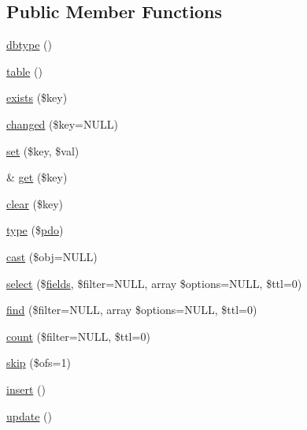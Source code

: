\subsection*{Public Member Functions}
\begin{DoxyCompactItemize}
\item 
\hyperlink{class_d_b_1_1_s_q_l_1_1_mapper_a38948c2fb1711f49b72f123cbd91e611}{dbtype} ()
\item 
\hyperlink{class_d_b_1_1_s_q_l_1_1_mapper_a5aa7b43c8ec77df216a71a27da0a321c}{table} ()
\item 
\hyperlink{class_d_b_1_1_s_q_l_1_1_mapper_ace1ae5be37bf26c172cc7ea4e1a65e26}{exists} (\$key)
\item 
\hyperlink{class_d_b_1_1_s_q_l_1_1_mapper_a20f740dfb4d3aa525f4109bdcf41dab7}{changed} (\$key=N\+U\+LL)
\item 
\hyperlink{class_d_b_1_1_s_q_l_1_1_mapper_ac8d8012023e560c81f55a629022cb65a}{set} (\$key, \$val)
\item 
\& \hyperlink{class_d_b_1_1_s_q_l_1_1_mapper_ac3695923790b06917410e205068b8376}{get} (\$key)
\item 
\hyperlink{class_d_b_1_1_s_q_l_1_1_mapper_a10a949ef75de6c82c98ac555f371ba83}{clear} (\$key)
\item 
\hyperlink{class_d_b_1_1_s_q_l_1_1_mapper_ab141334dd0647184bad274f4794b2387}{type} (\$\hyperlink{class_d_b_1_1_s_q_l_aa7612909f2506ecd3f2bc4ecbef3fe31}{pdo})
\item 
\hyperlink{class_d_b_1_1_s_q_l_1_1_mapper_aa33294a722f17e6e4946223bb73f13ab}{cast} (\$obj=N\+U\+LL)
\item 
\hyperlink{class_d_b_1_1_s_q_l_1_1_mapper_a30a0cf51ad0e9b95ced09845cd15d385}{select} (\$\hyperlink{class_d_b_1_1_s_q_l_1_1_mapper_a10174b3b4ef6bf0883a0246fa3ac2f8d}{fields}, \$filter=N\+U\+LL, array \$options=N\+U\+LL, \$ttl=0)
\item 
\hyperlink{class_d_b_1_1_s_q_l_1_1_mapper_a45e70f55799839fc0286bc94000924a7}{find} (\$filter=N\+U\+LL, array \$options=N\+U\+LL, \$ttl=0)
\item 
\hyperlink{class_d_b_1_1_s_q_l_1_1_mapper_ab1f3a3bd85dca49dceaea57f2fe21abf}{count} (\$filter=N\+U\+LL, \$ttl=0)
\item 
\hyperlink{class_d_b_1_1_s_q_l_1_1_mapper_aad399d205074eaeed711d5e0157b3c0a}{skip} (\$ofs=1)
\item 
\hyperlink{class_d_b_1_1_s_q_l_1_1_mapper_a473241246338cfccc4709ba896749019}{insert} ()
\item 
\hyperlink{class_d_b_1_1_s_q_l_1_1_mapper_a842e4774e3b3601a005b995c02f7e883}{update} ()

\end{DoxyCompactItemize}
